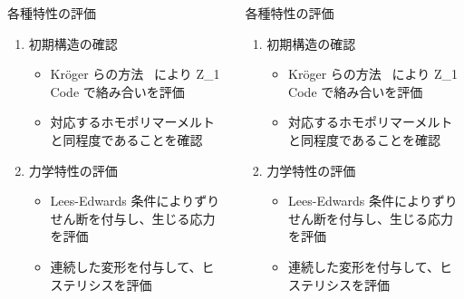\begin{columns}[totalwidth=.85\linewidth]
        \begin{itembox}[l]{各種特性の評価}
            \begin{enumerate}
                \item 初期構造の確認
                    \begin{itemize}
                        \normalsize
                        \item Kr\"{o}ger らの方法~\cite{kroger} により Z\_1 Code で絡み合いを評価
                        \item 対応するホモポリマーメルトと同程度であることを確認
                    \end{itemize}
                \item 力学特性の評価
                    \begin{itemize}
                        \normalsize
                        \item Lees-Edwards 条件によりずりせん断を付与し、生じる応力を評価
                        \item 連続した変形を付与して、ヒステリシスを評価
                    \end{itemize}	
            \end{enumerate}
        \end{itembox}
        
        \begin{itembox}[l]{各種特性の評価}
            \begin{enumerate}
                \item 初期構造の確認
                    \begin{itemize}
                        \normalsize
                        \item Kr\"{o}ger らの方法~\cite{kroger} により Z\_1 Code で絡み合いを評価
                        \item 対応するホモポリマーメルトと同程度であることを確認
                    \end{itemize}
                \item 力学特性の評価
                    \begin{itemize}
                        \normalsize
                        \item Lees-Edwards 条件によりずりせん断を付与し、生じる応力を評価
                        \item 連続した変形を付与して、ヒステリシスを評価
                    \end{itemize}	
            \end{enumerate}
        \end{itembox}
\end{columns}